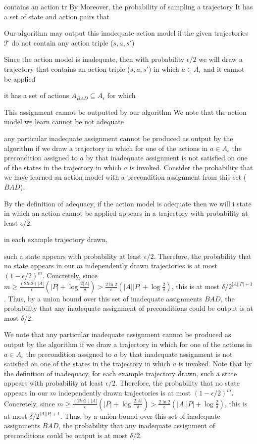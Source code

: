contains an action tr
By Moreover, the probability of sampling a trajectory 
It has a set of state and action pairs that 

Our algorithm may output this inadequate action model if 
the given trajectories $\mathcal{T}$ do not contain any action triple ($s,a,s'$) 


Since the action model is inadequate, then with probability $\epsilon/2$ 
we will draw a trajectory that contains an action triple ($s,a,s'$) 
in which $a\in A_\epsilon$ and it cannot be applied 


it has a set of actions $A_{BAD}\subseteq A_\epsilon$ for which 

This assignment cannot be outputted by our algorithm 
We note that the action model we learn cannot be not adequate 

any particular inadequate assignment cannot be produced as output by the algorithm if we draw a trajectory in which for one of the actions in $a\in A_\epsilon$ the precondition assigned to $a$ by that inadequate assignment is not satisfied on one of the states in the trajectory in which $a$ is invoked. 
Consider the probability that we have learned an action model with a precondition assignment from this set ($BAD$). 

By the definition of adequacy, if the action model is adequate then 
we will 
i state in which an action cannot be applied appears in a trajectory with probability at least $\epsilon/2$. 

in each example trajectory drawn, 


such a state appears with probability at least $\epsilon/2$. Therefore, the probability that no state appears in our $m$ independently drawn trajectories is at most $(1-\epsilon/2)^m$. Concretely, since $m\geq\frac{(2ln 2)|A|}{\epsilon}(|P|+\log\frac{2|A|}{\delta})>\frac{2\ln 2}{\epsilon}(|A||P|+\log\frac{2}{\delta})$, this is at most $\delta/2^{|A||P|+1}$. Thus, by a union bound over this set of inadequate assignments $BAD$, the probability that any inadequate assignment of preconditions could be output is at most $\delta/2$.



We note that any particular inadequate assignment cannot be produced as output by the algorithm if we draw a trajectory in which for one of the actions in $a\in A_\epsilon$ the precondition assigned to $a$ by that inadequate assignment is not satisfied on one of the states in the trajectory in which $a$ is invoked. Note that by the definition of inadequacy, for each example trajectory drawn, such a state appears with probability at least $\epsilon/2$. Therefore, the probability that no state appears in our $m$ independently drawn trajectories is at most $(1-\epsilon/2)^m$. Concretely, since $m\geq\frac{(2ln 2)|A|}{\epsilon}(|P|+\log\frac{2|A|}{\delta})>\frac{2\ln 2}{\epsilon}(|A||P|+\log\frac{2}{\delta})$, this is at most $\delta/2^{|A||P|+1}$. Thus, by a union bound over this set of inadequate assignments $BAD$, the probability that any inadequate assignment of preconditions could be output is at most $\delta/2$.



